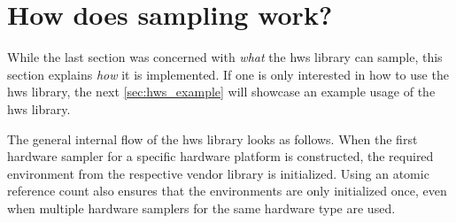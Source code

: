 \section{How does sampling work?}
\label{sec:hws_how}

While the last section was concerned with \textit{what} the hws library can sample, this section explains \textit{how} it is implemented. 
If one is only interested in how to use the hws library, the next \autoref{sec:hws_example} will showcase an example usage of the hws library. 

The general internal flow of the hws library looks as follows. 
When the first hardware sampler for a specific hardware platform is constructed, the required environment from the respective vendor library is initialized. 
Using an atomic reference count also ensures that the environments are only initialized once, even when multiple hardware samplers for the same hardware type are used. 

